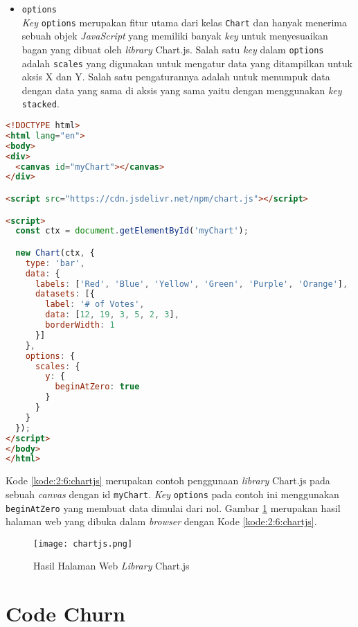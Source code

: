 \begin{itemize}
	\item \verb|options| \\
	\textit{Key} \verb|options| merupakan fitur utama dari kelas \verb|Chart| dan hanyak menerima sebuah objek \textit{JavaScript} yang memiliki banyak \textit{key} untuk menyesuaikan bagan yang dibuat oleh \textit{library} Chart.js. Salah satu \textit{key} dalam \verb|options| adalah \verb|scales| yang digunakan untuk mengatur data yang ditampilkan untuk aksis X dan Y. Salah satu pengaturannya adalah untuk menumpuk data dengan data yang sama di aksis yang sama yaitu dengan menggunakan \textit{key} \verb|stacked|.
\end{itemize}

\newpage

\begin{lstlisting}[language={html}, caption={Contoh kode penggunaan Chart.js}, label={kode:2:6:chartjs}]
<!DOCTYPE html>
<html lang="en">
<body>
<div>
  <canvas id="myChart"></canvas>
</div>

<script src="https://cdn.jsdelivr.net/npm/chart.js"></script>

<script>
  const ctx = document.getElementById('myChart');

  new Chart(ctx, {
    type: 'bar',
    data: {
      labels: ['Red', 'Blue', 'Yellow', 'Green', 'Purple', 'Orange'],
      datasets: [{
        label: '# of Votes',
        data: [12, 19, 3, 5, 2, 3],
        borderWidth: 1
      }]
    },
    options: {
      scales: {
        y: {
          beginAtZero: true
        }
      }
    }
  });
</script>
</body>
</html>
\end{lstlisting}

Kode \ref{kode:2:6:chartjs} merupakan contoh penggunaan \textit{library} Chart.js pada sebuah \textit{canvas} dengan id \verb|myChart|. \textit{Key} \verb|options| pada contoh ini menggunakan \verb|beginAtZero| yang membuat data dimulai dari nol. Gambar \ref{fig:2:6:chartjs} merupakan hasil halaman web yang dibuka dalam \textit{browser} dengan Kode \ref{kode:2:6:chartjs}.

\begin{figure}[H]
	\centering
	\texttt{[image: chartjs.png]}
	\caption{Hasil Halaman Web \textit{Library} Chart.js}
	\label{fig:2:6:chartjs}
\end{figure}

\section{Code Churn}

